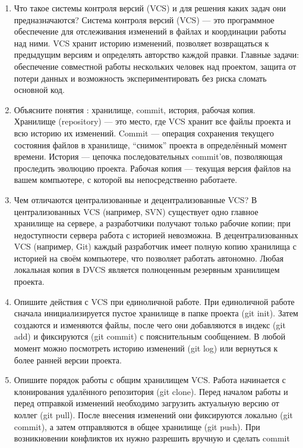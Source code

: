 \documentclass[
  english,
  russian,
  12pt,
  a4paper,
  DIV=11,
  numbers=noendperiod]{scrreprt}
\begin{document}
\begin{enumerate}
\def\labelenumi{\arabic{enumi}.}
\item
  Что такое системы контроля версий (VCS) и для решения каких задач они
  предназначаются? Система контроля версий (VCS) --- это программное
  обеспечение для отслеживания изменений в файлах и координации работы
  над ними. VCS хранит историю изменений, позволяет возвращаться к
  предыдущим версиям и определять авторство каждой правки. Главные
  задачи: обеспечение совместной работы нескольких человек над проектом,
  защита от потери данных и возможность экспериментировать без риска
  сломать основной код.
\item
  Объясните понятия : хранилище, commit, история, рабочая копия.
  Хранилище (repository) --- это место, где VCS хранит все файлы проекта
  и всю историю их изменений. Commit --- операция сохранения текущего
  состояния файлов в хранилище, \enquote{снимок} проекта в определённый
  момент времени. История --- цепочка последовательных commit'ов,
  позволяющая проследить эволюцию проекта. Рабочая копия --- текущая
  версия файлов на вашем компьютере, с которой вы непосредственно
  работаете.
\item
  Чем отличаются централизованные и децентрализованные VCS? В
  централизованных VCS (например, SVN) существует одно главное хранилище
  на сервере, а разработчики получают только рабочие копии; при
  недоступности сервера работа с историей невозможна. В
  децентрализованных VCS (например, Git) каждый разработчик имеет полную
  копию хранилища с историей на своём компьютере, что позволяет работать
  автономно. Любая локальная копия в DVCS является полноценным резервным
  хранилищем проекта.
\item
  Опишите действия с VCS при единоличной работе. При единоличной работе
  сначала инициализируется пустое хранилище в папке проекта (git init).
  Затем создаются и изменяются файлы, после чего они добавляются в
  индекс (git add) и фиксируются (git commit) с пояснительным
  сообщением. В любой момент можно посмотреть историю изменений (git
  log) или вернуться к более ранней версии проекта.
\item
  Опишите порядок работы с общим хранилищем VCS. Работа начинается с
  клонирования удалённого репозитория (git clone). Перед началом работы
  и перед отправкой изменений необходимо загрузить актуальную версию от
  коллег (git pull). После внесения изменений они фиксируются локально
  (git commit), а затем отправляются в общее хранилище (git push). При
  возникновении конфликтов их нужно разрешить вручную и сделать commit

\end{enumerate}
\end{document}
